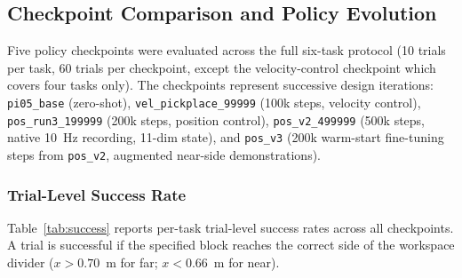 \subsection{Checkpoint Comparison and Policy Evolution}

Five policy checkpoints were evaluated across the full six-task protocol
(10 trials per task, 60 trials per checkpoint, except the velocity-control checkpoint
which covers four tasks only).
The checkpoints represent successive design iterations:
\texttt{pi05\_base} (zero-shot), \texttt{vel\_pickplace\_99999} (100k steps,
velocity control), \texttt{pos\_run3\_199999} (200k steps, position control),
\texttt{pos\_v2\_499999} (500k steps, native 10~Hz recording, 11-dim state), and
\texttt{pos\_v3} (200k warm-start fine-tuning steps from \texttt{pos\_v2},
augmented near-side demonstrations).

\subsubsection{Trial-Level Success Rate}

Table~\ref{tab:success} reports per-task trial-level success rates across all
checkpoints.
A trial is successful if the specified block reaches the correct side of the
workspace divider ($x > 0.70$~m for far; $x < 0.66$~m for near).

